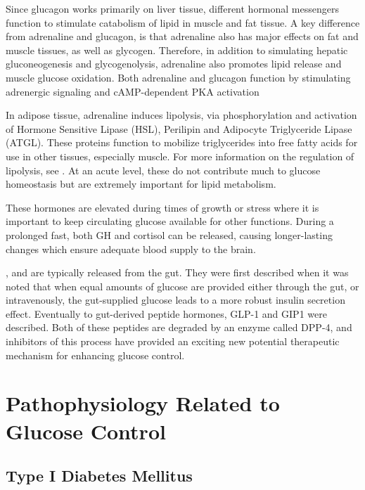 \documentclass{tufte-handout}
\begin{document}
Since glucagon works primarily on liver tissue, different hormonal messengers function to stimulate catabolism of lipid in muscle and fat tissue.  A key difference from adrenaline and glucagon, is that adrenaline also has major effects on fat and muscle tissues, as well as glycogen.  Therefore, in addition to simulating hepatic gluconeogenesis and glycogenolysis, adrenaline also promotes lipid release and muscle glucose oxidation.  Both adrenaline and glucagon function by stimulating adrenergic signaling and cAMP-dependent PKA activation

In adipose tissue, adrenaline induces lipolysis, via phosphorylation and activation of Hormone Sensitive Lipase (HSL), Perilipin and Adipocyte Triglyceride Lipase (ATGL).  These proteins function to mobilize triglycerides into free fatty acids for use in other tissues, especially muscle.  For more information on the regulation of lipolysis, see \cite{Young2013}.  At an acute level, these do not contribute much to glucose homeostasis but are extremely important for lipid metabolism.

  These hormones are elevated during times of growth or stress where it is important to keep circulating glucose available for other functions.  During a prolonged fast, both GH and cortisol can be released, causing longer-lasting changes which ensure adequate blood supply to the brain.

, and are typically released from the gut.  They were first described when it was noted that when equal amounts of glucose are provided either through the gut, or intravenously, the gut-supplied glucose leads to a more robust insulin secretion effect.  Eventually to gut-derived peptide hormones, GLP-1 and GIP1 were described.  Both of these peptides are degraded by an enzyme called DPP-4, and inhibitors of this process have provided an exciting new potential therapeutic mechanism for enhancing glucose control.

\section{Pathophysiology Related to Glucose Control}

\subsection{Type I Diabetes Mellitus}
\end{document}
